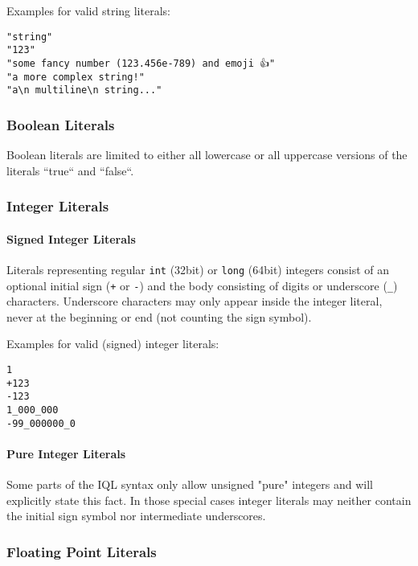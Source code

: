 \documentclass[11pt]{article}
\begin{document}
Examples for valid string literals:

\begin{verbatim}
"string"
"123"
"some fancy number (123.456e-789) and emoji 👍"
"a more complex string!"
"a\n multiline\n string..."
\end{verbatim}

\subsubsection{Boolean Literals}
\label{sec:boolean-literals}

Boolean literals are limited to either all lowercase or all uppercase versions of the literals ``true`` and ``false``.

\subsubsection{Integer Literals}
\label{sec:integer-literals}

\paragraph{Signed Integer Literals}
Literals representing regular \texttt{int} (32bit) or \texttt{long} (64bit) integers consist of an optional initial sign (\texttt{+} or \texttt{-}) and the body consisting of digits or underscore (\texttt{\_}) characters.
Underscore characters may only appear inside the integer literal, never at the beginning or end (not counting the sign symbol).

Examples for valid (signed) integer literals:

\begin{verbatim}
1
+123
-123
1_000_000
-99_000000_0
\end{verbatim}

\paragraph{Pure Integer Literals}
Some parts of the IQL syntax only allow unsigned "pure" integers and will explicitly state this fact. In those special cases integer literals may neither contain the initial sign symbol nor intermediate underscores.

\subsubsection{Floating Point Literals}
\label{sec:floating-point-literals}
\end{document}
